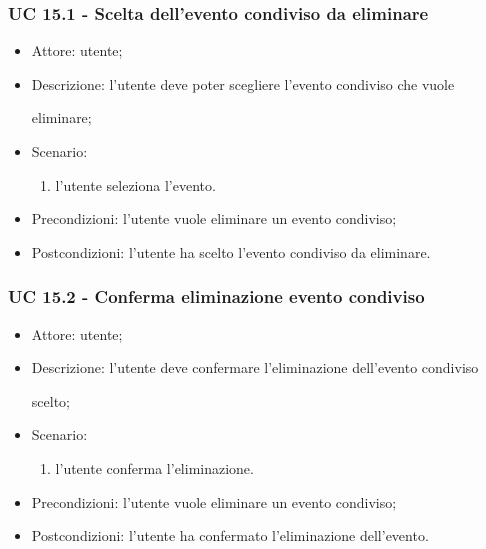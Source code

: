 \subsubsection{UC 15.1 - Scelta dell'evento condiviso da eliminare} \label{sec: UC 15.1}
\begin{itemize}
    \item Attore: utente;
    \item Descrizione: l'utente deve poter scegliere l'evento condiviso che vuole \par eliminare;
    \item Scenario:
        \begin{enumerate}
        \item l'utente seleziona l'evento.
        \end{enumerate}
    
    \item Precondizioni: l'utente vuole eliminare un evento condiviso;
    \item Postcondizioni: l'utente ha scelto l'evento condiviso da eliminare.
\end{itemize}


\subsubsection{UC 15.2 - Conferma eliminazione evento condiviso} \label{sec: UC 15.2}
\begin{itemize}
    \item Attore: utente;
    \item Descrizione: l'utente deve confermare l'eliminazione dell'evento condiviso \par scelto;
    \item Scenario:
        \begin{enumerate}
        \item l'utente conferma l'eliminazione.
        \end{enumerate}
    
    \item Precondizioni: l'utente vuole eliminare un evento condiviso;
    \item Postcondizioni: l'utente ha confermato l'eliminazione dell'evento.
\end{itemize}


